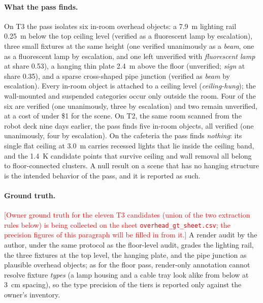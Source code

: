\paragraph{What the pass finds.}
On T3 the pass isolates six in-room overhead objects: a 7.9~m lighting rail
0.25~m below the top ceiling level (verified as a fluorescent lamp by
escalation), three small fixtures at the same height (one verified
unanimously as a \emph{beam}, one as a fluorescent lamp by escalation, and
one left unverified with \emph{fluorescent lamp} at share 0.53), a hanging
thin plate 2.4~m above the floor (unverified; \emph{sign} at share 0.35),
and a sparse cross-shaped pipe junction (verified as \emph{beam} by
escalation). Every in-room object is attached to a ceiling level
(\emph{ceiling-hung}); the wall-mounted and suspended categories occur only
outside the room. Four of the six are verified (one unanimously, three by
escalation) and two remain unverified, at a cost of under \$1 for the scene.
On T2, the same room scanned from the
robot deck nine days earlier, the pass finds five in-room objects, all
verified (one unanimously, four by escalation). On the cafeteria the pass
finds \emph{nothing}: its single flat ceiling at 3.0~m carries recessed
lights that lie inside the ceiling band, and the 1.4~K candidate points that
survive ceiling and wall removal all belong to floor-connected clusters. A
null result on a scene that has no hanging structure is the intended
behavior of the pass, and it is reported as such.

\paragraph{Ground truth.}
\textcolor{red}{[Owner ground truth for the eleven T3 candidates (union of
the two extraction rules below) is being collected on the sheet
\texttt{overhead\_gt\_sheet.csv}; the precision figures of this paragraph
will be filled in from it.]} A render audit by the author, under the same
protocol as the floor-level audit, grades the lighting rail, the three
fixtures at the top level, the hanging plate, and the pipe junction as
plausible overhead objects; as for the floor pass, render-only annotation
cannot resolve fixture \emph{types} (a lamp housing and a cable tray look
alike from below at 3~cm spacing), so the type precision of the tiers is
reported only against the owner's inventory.


